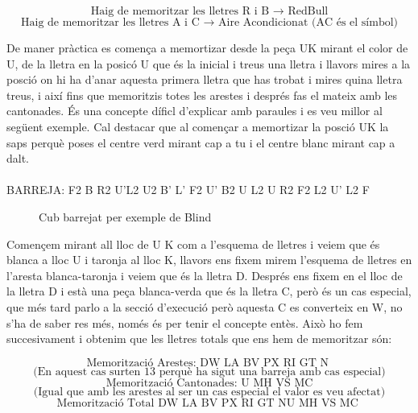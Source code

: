 $$ \textrm{Haig de memoritzar les lletres R i B    }  \rightarrow \textrm{   RedBull} $$
$$ \textrm{Haig de memoritzar les lletres A i C   }  \rightarrow \textrm{   Aire Acondicionat (AC és el símbol)} $$

\vspace{0.33cm}

De maner pràctica es comença a memortizar desde la peça UK mirant el color de U, de la lletra en la posicó U que és la inicial i treus una lletra i llavors mires a la posció on hi ha d'anar aquesta primera lletra que has trobat i mires quina lletra treus, i així fins que memoritzis totes les arestes i després fas el mateix amb les cantonades. És una concepte díficl d'explicar amb paraules i es veu millor al següent exemple. Cal destacar que al començar a memortizar la posció UK la saps perquè poses el centre verd mirant cap a tu i el centre blanc mirant cap a dalt.
\\\\BARREJA: F2 B R2 U'L2 U2 B' L' F2 U' B2 U L2 U R2 F2 L2 U' L2 F

\begin{figure}[h!]
    \centering\RubikCubeSolvedWY
    \caption{Cub barrejat per exemple de Blind}
    \label{exemple-memo}
    \end{figure}

Començem mirant all lloc de U K com a l'esquema de lletres i veiem que és blanca a lloc U i taronja al lloc K, llavors ens fixem mirem l'esquema de lletres en l'aresta blanca-taronja i veiem que és la lletra D. 
Després ens fixem en el lloc de la lletra D i està una peça blanca-verda que és la lletra C, però és un cas especial, que més tard parlo a la secció d'execució però aquesta C es converteix en W, no s'ha de saber res més, només és per tenir el concepte entès. Això ho fem succesivament i obtenim que les lletres totals que ens hem de memoritzar són:

$$ \textrm{Memorització Arestes: DW LA BV PX RI GT N } $$ $$ \textrm{(En aquest cas surten 13 perquè ha sigut una barreja amb cas especial)} $$
$$ \textrm{Memorització Cantonades: U MH VS MC} $$ $$ \textrm{(Igual que amb les arestes al ser un cas especial el valor es veu afectat)} $$
\vspace{0.17cm}
$$ \textrm{Memorització Total DW LA BV PX RI GT NU MH VS MC } $$


